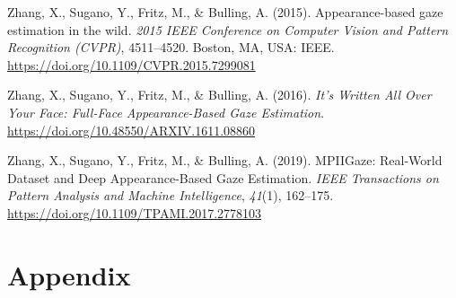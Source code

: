 \documentclass[
  man,floatsintext]{apa6}
\newlength{\cslhangindent}
\newenvironment{CSLReferences}[2] %
 {\begin{list}{}{%
  \setlength{\itemindent}{0pt}
  \setlength{\leftmargin}{0pt}
  \setlength{\parsep}{0pt}
  \ifodd #1
   \setlength{\leftmargin}{\cslhangindent}
   \setlength{\itemindent}{-1\cslhangindent}
  \fi
  \setlength{\itemsep}{#2\baselineskip}}}
 {\end{list}}
\begin{document}
\begin{CSLReferences}{1}{0}
Zhang, X., Sugano, Y., Fritz, M., \& Bulling, A. (2015). Appearance-based gaze estimation in the wild. \emph{2015 {IEEE Conference} on {Computer Vision} and {Pattern Recognition} ({CVPR})}, 4511--4520. Boston, MA, USA: IEEE. \url{https://doi.org/10.1109/CVPR.2015.7299081}

Zhang, X., Sugano, Y., Fritz, M., \& Bulling, A. (2016). \emph{It's {Written All Over Your Face}: {Full-Face Appearance-Based Gaze Estimation}}. \url{https://doi.org/10.48550/ARXIV.1611.08860}

Zhang, X., Sugano, Y., Fritz, M., \& Bulling, A. (2019). {MPIIGaze}: {Real-World Dataset} and {Deep Appearance-Based Gaze Estimation}. \emph{IEEE Transactions on Pattern Analysis and Machine Intelligence}, \emph{41}(1), 162--175. \url{https://doi.org/10.1109/TPAMI.2017.2778103}

\end{CSLReferences}

\endgroup

\newpage

\section{Appendix}\label{appendix}
\end{document}
